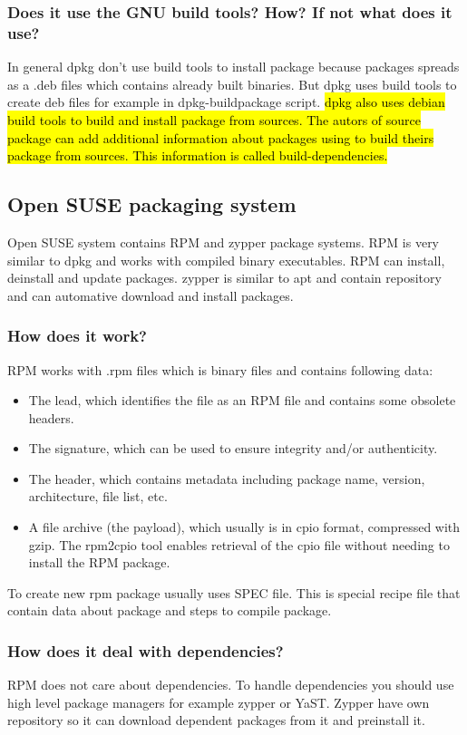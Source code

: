 \documentclass[a4paper,11pt]{article}
\begin{document}
\subsubsection{Does it use the GNU build tools? How? If not what does it use?}
In general dpkg don't use build tools to install package because packages spreads as a .deb files which contains already built binaries. But dpkg uses build tools to create deb files for example in dpkg-buildpackage script. \hl{dpkg also uses debian build tools to build and install package from sources. The autors of source package can add additional information about packages using to build theirs package from sources. This information is called build-dependencies.}

\subsection{Open SUSE packaging system}

Open SUSE system contains RPM and zypper package systems. RPM is very similar to dpkg and works with compiled binary executables. RPM can install, deinstall and update packages. zypper is similar to apt and contain repository and can automative download and install packages.

\subsubsection{How does it work?}
RPM works with .rpm files which is binary files and contains following data:

\begin{itemize}
  \item The lead, which identifies the file as an RPM file and contains some obsolete headers.
  \item The signature, which can be used to ensure integrity and/or authenticity.
  \item The header, which contains metadata including package name, version, architecture, file list, etc.
  \item A file archive (the payload), which usually is in cpio format, compressed with gzip. The rpm2cpio tool enables retrieval of the cpio file without needing to install the RPM package.
\end{itemize}

To create new rpm package usually uses SPEC file. This is special recipe file that contain data about package and steps to compile package. 

\subsubsection{How does it deal with dependencies?}
RPM does not care about dependencies. To handle dependencies you should use high level package managers for example zypper or YaST. Zypper have own repository so it can download dependent packages from it and preinstall it.
\end{document}

